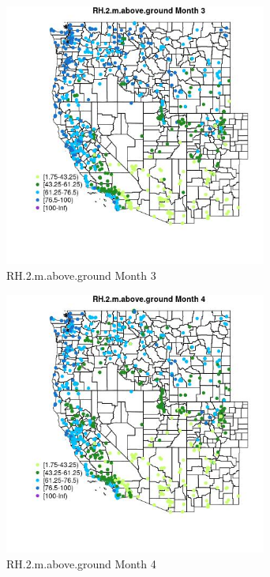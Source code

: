 \begin{figure} 
\centering  
\includegraphics[width=0.77\textwidth]{Code_Outputs/Report_ML_input_PM25_Step4_part_f_de_duplicated_aveswNAs_MapObsMo3RH2maboveground.jpg} 
\caption{\label{fig:Report_ML_input_PM25_Step4_part_f_de_duplicated_aveswNAsMapObsMo3RH2maboveground}RH.2.m.above.ground Month 3} 
\end{figure} 
 

\begin{figure} 
\centering  
\includegraphics[width=0.77\textwidth]{Code_Outputs/Report_ML_input_PM25_Step4_part_f_de_duplicated_aveswNAs_MapObsMo4RH2maboveground.jpg} 
\caption{\label{fig:Report_ML_input_PM25_Step4_part_f_de_duplicated_aveswNAsMapObsMo4RH2maboveground}RH.2.m.above.ground Month 4} 
\end{figure} 
 

